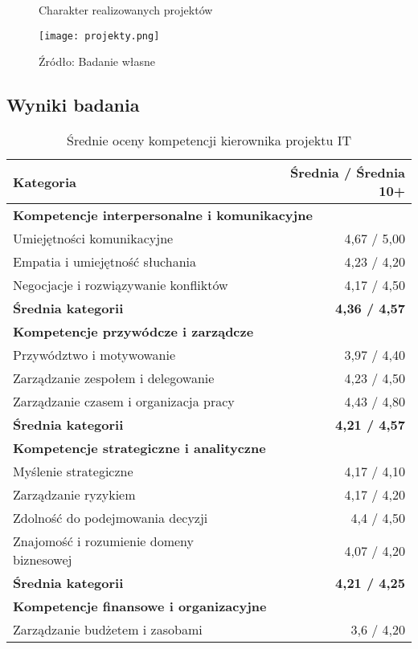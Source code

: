 \begin{figure}
  \caption{Charakter realizowanych projektów}
  \centering
  \texttt{[image: projekty.png]}
  \caption*{Źródło: Badanie własne}
\end{figure}

\subsection{Wyniki badania}

\begin{table}[htbp]
\centering
\caption{Średnie oceny kompetencji kierownika projektu IT}
\begin{tabular}{p{10cm} r}
\toprule
\textbf{Kategoria} & \textbf{Średnia / Średnia 10+} \\
\midrule
\multicolumn{2}{l}{\textbf{Kompetencje interpersonalne i komunikacyjne}} \\
Umiejętności komunikacyjne & 4{,}67 / 5{,}00 \\
Empatia i umiejętność słuchania & 4{,}23 / 4{,}20 \\
Negocjacje i rozwiązywanie konfliktów & 4{,}17 / 4{,}50 \\
\textbf{Średnia kategorii} & \textbf{4{,}36 / 4{,}57} \\  
\midrule
\multicolumn{2}{l}{\textbf{Kompetencje przywódcze i zarządcze}} \\
Przywództwo i motywowanie & 3{,}97 / 4{,}40 \\
Zarządzanie zespołem i delegowanie & 4{,}23 / 4{,}50 \\
Zarządzanie czasem i organizacja pracy & 4{,}43 / 4{,}80 \\
\textbf{Średnia kategorii} & \textbf{4{,}21 / 4{,}57} \\
\midrule
\multicolumn{2}{l}{\textbf{Kompetencje strategiczne i analityczne}} \\
Myślenie strategiczne & 4{,}17 / 4{,}10 \\
Zarządzanie ryzykiem & 4{,}17 / 4{,}20 \\
Zdolność do podejmowania decyzji & 4{,}4 / 4{,}50 \\
Znajomość i rozumienie domeny biznesowej & 4{,}07 / 4{,}20 \\
\textbf{Średnia kategorii} & \textbf{4{,}21 / 4{,}25} \\
\midrule
\multicolumn{2}{l}{\textbf{Kompetencje finansowe i organizacyjne}} \\
Zarządzanie budżetem i zasobami & 3{,}6 / 4{,}20 \\

\end{tabular}
\end{table}
